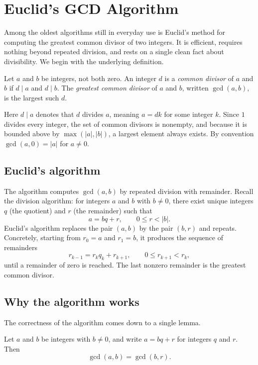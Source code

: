 \section{Euclid's GCD Algorithm}

Among the oldest algorithms still in everyday use is Euclid's method for computing the greatest common divisor of two integers. It is efficient, requires nothing beyond repeated division, and rests on a single clean fact about divisibility. We begin with the underlying definition.

\begin{definition}
Let $a$ and $b$ be integers, not both zero. An integer $d$ is a \emph{common divisor} of $a$ and $b$ if $d \mid a$ and $d \mid b$. The \emph{greatest common divisor} of $a$ and $b$, written $\gcd(a, b)$, is the largest such $d$.
\end{definition}

Here $d \mid a$ denotes that $d$ divides $a$, meaning $a = dk$ for some integer $k$. Since $1$ divides every integer, the set of common divisors is nonempty, and because it is bounded above by $\max(|a|, |b|)$, a largest element always exists. By convention $\gcd(a, 0) = |a|$ for $a \neq 0$.

\subsection{Euclid's algorithm}

The algorithm computes $\gcd(a, b)$ by repeated division with remainder. Recall the division algorithm: for integers $a$ and $b$ with $b \neq 0$, there exist unique integers $q$ (the quotient) and $r$ (the remainder) such that
\[
a = bq + r, \qquad 0 \leq r < |b|.
\]
Euclid's algorithm replaces the pair $(a, b)$ by the pair $(b, r)$ and repeats. Concretely, starting from $r_0 = a$ and $r_1 = b$, it produces the sequence of remainders
\[
r_{k-1} = r_k q_k + r_{k+1}, \qquad 0 \leq r_{k+1} < r_k,
\]
until a remainder of zero is reached. The last nonzero remainder is the greatest common divisor.

\subsection{Why the algorithm works}

The correctness of the algorithm comes down to a single lemma.

\begin{lemma}\label{lem:gcd-step}
Let $a$ and $b$ be integers with $b \neq 0$, and write $a = bq + r$ for integers $q$ and $r$. Then
\[
\gcd(a, b) = \gcd(b, r).
\]
\end{lemma}

